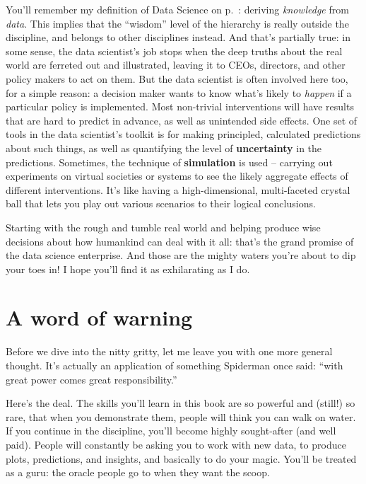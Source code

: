 You'll remember my definition of Data Science on p.~\pageref{dsDefinition}:
deriving \textit{knowledge} from \textit{data}. This implies that the
``wisdom'' level of the hierarchy is really outside the discipline, and belongs
to other disciplines instead. And that's partially true: in some sense, the
data scientist's job stops when the deep truths about the real world are
ferreted out and illustrated, leaving it to CEOs, directors, and other policy
makers to act on them. But the data scientist is often involved here too, for a
simple reason: a decision maker wants to know what's likely to \textit{happen}
if a particular policy is implemented. Most non-trivial interventions will have
results that are hard to predict in advance, as well as unintended side
effects. One set of tools in the data scientist's toolkit is for making
principled, calculated predictions about such things, as well as quantifying
the level of \textbf{uncertainty} in the predictions. Sometimes, the technique
of \textbf{simulation} is used -- carrying out experiments on virtual societies
or systems to see the likely aggregate effects of different interventions. It's
like having a high-dimensional, multi-faceted crystal ball that lets you play
out various scenarios to their logical conclusions.

\bigskip

Starting with the rough and tumble real world and helping produce wise
decisions about how humankind can deal with it all: that's the grand promise of
the data science enterprise. And those are the mighty waters you're about to
dip your toes in! I hope you'll find it as exhilarating as I do.



\section{A word of warning}


Before we dive into the nitty gritty, let me leave you with one more general
thought. It's actually an application of something Spiderman once said: ``with
great power comes great responsibility.''


Here's the deal. The skills you'll learn in this book are so powerful and
(still!) so rare, that when you demonstrate them, people will think you can
walk on water. If you continue in the discipline, you'll become highly
sought-after (and well paid). People will constantly be asking you to work
with new data, to produce plots, predictions, and insights, and basically to do
your magic. You'll be treated as a guru: the oracle people go to when they want
the scoop.

